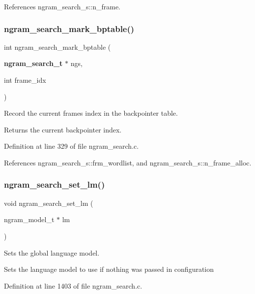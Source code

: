 References ngram\+\_\+search\+\_\+s\+::n\+\_\+frame.

\mbox{\label{ngram__search_8h_a7772e007b7d7fdf437c87aeb08b59c71}} 
\subsubsection{ngram\+\_\+search\+\_\+mark\+\_\+bptable()}
{\footnotesize\ttfamily int ngram\+\_\+search\+\_\+mark\+\_\+bptable (\begin{DoxyParamCaption}\item[{\textbf{ ngram\+\_\+search\+\_\+t} $\ast$}]{ngs,  }\item[{int}]{frame\+\_\+idx }\end{DoxyParamCaption})}



Record the current frame\textquotesingle{}s index in the backpointer table. 

\begin{DoxyReturn}{Returns}
the current backpointer index. 
\end{DoxyReturn}


Definition at line 329 of file ngram\+\_\+search.\+c.



References ngram\+\_\+search\+\_\+s\+::frm\+\_\+wordlist, and ngram\+\_\+search\+\_\+s\+::n\+\_\+frame\+\_\+alloc.

\mbox{\label{ngram__search_8h_a0e681022d3fa0e63da066aad123245e7}} 
\subsubsection{ngram\+\_\+search\+\_\+set\+\_\+lm()}
{\footnotesize\ttfamily void ngram\+\_\+search\+\_\+set\+\_\+lm (\begin{DoxyParamCaption}\item[{ngram\+\_\+model\+\_\+t $\ast$}]{lm }\end{DoxyParamCaption})}



Sets the global language model. 

Sets the language model to use if nothing was passed in configuration 

Definition at line 1403 of file ngram\+\_\+search.\+c.

